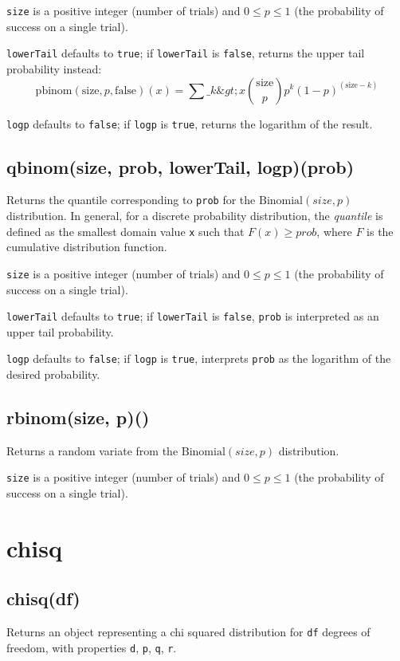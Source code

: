 \documentclass{article}
\begin{document}
\texttt{size} is a positive integer (number of trials) and $0 \leq p \leq 1$
(the probability of success on a single trial).


\texttt{lowerTail} defaults to \texttt{true}; if \texttt{lowerTail} is \texttt{false}, returns
the upper tail probability instead:
$$\textrm{pbinom}(\textrm{size}, p, \textrm{false})(x) = \sum\_{k\&gt;x} \binom{\textrm{size}}{p}p^{k}(1-p)^{(\textrm{size}-k)}$$


\texttt{logp} defaults to \texttt{false}; if \texttt{logp} is \texttt{true}, returns the logarithm
of the result.


    \subsection*{qbinom(size, prob, lowerTail, logp)(prob)}
    Returns the quantile corresponding to \texttt{prob}
for the $\textrm{Binomial}(size, p)$ distribution.
In general, for a discrete probability
distribution, the \emph{quantile} is defined as the smallest domain value
\texttt{x} such that $F(x) \geq prob$, where $F$ is the cumulative
distribution function.


\texttt{size} is a positive integer (number of trials) and $0 \leq p \leq 1$
(the probability of success on a single trial).


\texttt{lowerTail} defaults to \texttt{true}; if \texttt{lowerTail} is \texttt{false}, \texttt{prob} is
interpreted as an upper tail probability.


\texttt{logp} defaults to \texttt{false}; if \texttt{logp} is \texttt{true}, interprets \texttt{prob} as
the logarithm of the desired probability.


    \subsection*{rbinom(size, p)()}
    Returns a random variate from the $\textrm{Binomial}(size, p)$ distribution.


\texttt{size} is a positive integer (number of trials) and $0 \leq p \leq 1$
(the probability of success on a single trial).


  \section{chisq}
    \subsection*{chisq(df)}
    Returns an object representing a chi squared distribution for \texttt{df} degrees
of freedom, with properties \texttt{d}, \texttt{p}, \texttt{q}, \texttt{r}.
\end{document}
